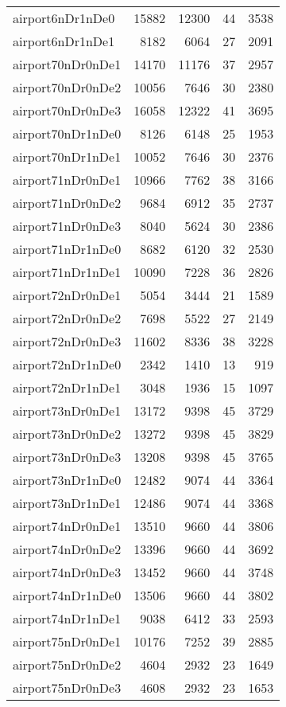 \begin{tabular}{lrrrr}
airport6nDr1nDe0 & 15882 & 12300 & 44 & 3538 \\
airport6nDr1nDe1 & 8182 & 6064 & 27 & 2091 \\
airport70nDr0nDe1 & 14170 & 11176 & 37 & 2957 \\
airport70nDr0nDe2 & 10056 & 7646 & 30 & 2380 \\
airport70nDr0nDe3 & 16058 & 12322 & 41 & 3695 \\
airport70nDr1nDe0 & 8126 & 6148 & 25 & 1953 \\
airport70nDr1nDe1 & 10052 & 7646 & 30 & 2376 \\
airport71nDr0nDe1 & 10966 & 7762 & 38 & 3166 \\
airport71nDr0nDe2 & 9684 & 6912 & 35 & 2737 \\
airport71nDr0nDe3 & 8040 & 5624 & 30 & 2386 \\
airport71nDr1nDe0 & 8682 & 6120 & 32 & 2530 \\
airport71nDr1nDe1 & 10090 & 7228 & 36 & 2826 \\
airport72nDr0nDe1 & 5054 & 3444 & 21 & 1589 \\
airport72nDr0nDe2 & 7698 & 5522 & 27 & 2149 \\
airport72nDr0nDe3 & 11602 & 8336 & 38 & 3228 \\
airport72nDr1nDe0 & 2342 & 1410 & 13 & 919 \\
airport72nDr1nDe1 & 3048 & 1936 & 15 & 1097 \\
airport73nDr0nDe1 & 13172 & 9398 & 45 & 3729 \\
airport73nDr0nDe2 & 13272 & 9398 & 45 & 3829 \\
airport73nDr0nDe3 & 13208 & 9398 & 45 & 3765 \\
airport73nDr1nDe0 & 12482 & 9074 & 44 & 3364 \\
airport73nDr1nDe1 & 12486 & 9074 & 44 & 3368 \\
airport74nDr0nDe1 & 13510 & 9660 & 44 & 3806 \\
airport74nDr0nDe2 & 13396 & 9660 & 44 & 3692 \\
airport74nDr0nDe3 & 13452 & 9660 & 44 & 3748 \\
airport74nDr1nDe0 & 13506 & 9660 & 44 & 3802 \\
airport74nDr1nDe1 & 9038 & 6412 & 33 & 2593 \\
airport75nDr0nDe1 & 10176 & 7252 & 39 & 2885 \\
airport75nDr0nDe2 & 4604 & 2932 & 23 & 1649 \\
airport75nDr0nDe3 & 4608 & 2932 & 23 & 1653 \\

\end{tabular}
